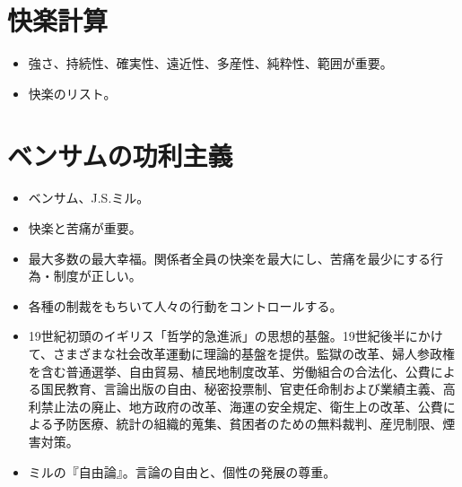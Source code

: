 \documentclass[uplatex,dvipdfmx]{jsarticle}
\begin{document}
\section{快楽計算}
\begin{itemize}
\item 強さ、持続性、確実性、遠近性、多産性、純粋性、範囲が重要。
\item 快楽のリスト。
\end{itemize}

\fi

\section{ベンサムの功利主義}


\begin{itemize}
\item ベンサム、J.S.ミル。
\item 快楽と苦痛が重要。
\item 最大多数の最大幸福。関係者全員の快楽を最大にし、苦痛を最少にする行為・制度が正しい。
\item 各種の制裁をもちいて人々の行動をコントロールする。
\item 19世紀初頭のイギリス「哲学的急進派」の思想的基盤。19世紀後半にかけて、さまざまな社会改革運動に理論的基盤を提供。監獄の改革、婦人参政権を含む普通選挙、自由貿易、植民地制度改革、労働組合の合法化、公費による国民教育、言論出版の自由、秘密投票制、官吏任命制および業績主義、高利禁止法の廃止、地方政府の改革、海運の安全規定、衛生上の改革、公費による予防医療、統計の組織的蒐集、貧困者のための無料裁判、産児制限、煙害対策。
\item ミルの『自由論』。言論の自由と、個性の発展の尊重。
\end{itemize}
\end{document}
